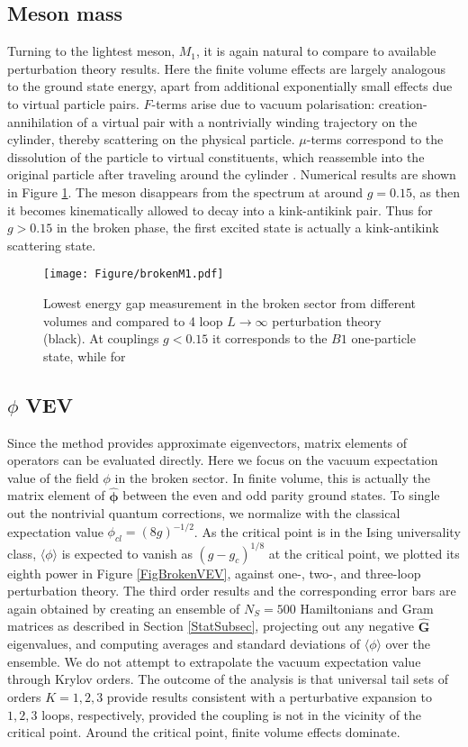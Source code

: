 \documentclass[twocolumn,secnumarabic,amssymb, nobibnotes, aps, prd]{revtex4-2}
\begin{document}
\subsection{Meson mass}
Turning to the lightest meson, $M_1$, it is again natural to compare to available perturbation theory results.  Here the finite volume effects are largely analogous to the ground state energy, apart from additional exponentially small effects due to virtual particle pairs.  $F$-terms arise due to vacuum polarisation: creation-annihilation of a virtual pair with a nontrivially winding trajectory on the cylinder, thereby scattering on the physical particle. $\mu$-terms correspond to the dissolution of the particle to virtual constituents, which reassemble into the original particle after traveling around the cylinder \cite{Luscher:1985dn,Klassen:1990ub}. Numerical results are shown in Figure \ref{FigBrokenMesonMass}. The meson disappears from the spectrum at around $g=0.15$, as then it becomes kinematically allowed to decay into a kink-antikink pair. Thus for $g>0.15$ in the broken phase, the first excited state is actually a kink-antikink scattering state. \cite{Bajnok:2015bgw}

\begin{figure}
\centering
\texttt{[image: Figure/brokenM1.pdf]}
\caption{Lowest energy gap measurement in the broken sector from different volumes and compared to 4 loop $L\rightarrow\infty$ perturbation theory (black). At couplings $g<0.15$ it corresponds to the $B1$ one-particle state, while for }
\label{FigBrokenMesonMass}
\end{figure}

\subsection{$\phi$ VEV}
Since the method provides approximate eigenvectors, matrix elements of operators can be evaluated directly. Here we focus on the vacuum expectation value of the field $\phi$ in the broken sector. In finite volume, this is actually the matrix element of $\hat{\boldsymbol{\phi}}$ between the even and odd parity ground states. To single out the nontrivial quantum corrections, we normalize with the classical expectation value $\phi_{cl}=(8g)^{-1/2}$. As the critical point is in the Ising universality class,  $\langle\phi\rangle$ is expected to vanish as $(g-g_c)^{1/8}$ at the critical point, we plotted its eighth power in Figure \ref{FigBrokenVEV}, against one-, two-, and three-loop perturbation theory. 
The third order results and the corresponding error bars are again obtained by creating an ensemble of $N_S=500$ Hamiltonians and Gram matrices as described in Section \ref{StatSubsec}, projecting out any negative $\hat{\mathbf{G}}$ eigenvalues, and computing averages and standard deviations of $\langle\phi\rangle$ over the ensemble. 
We do not attempt to extrapolate the vacuum expectation value through Krylov orders. The outcome of the analysis is that universal tail sets of orders $K=1,2,3$ provide results consistent with a perturbative expansion to $1,2,3$ loops, respectively, provided the coupling is not in the vicinity of the critical point. Around the critical point, finite volume effects dominate.
\end{document}
